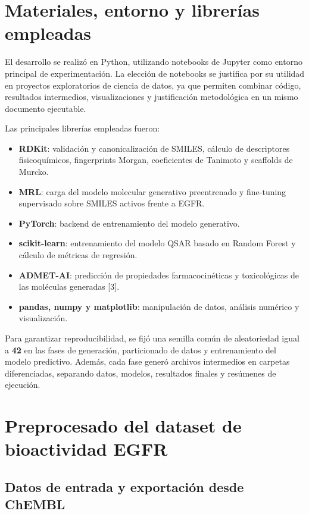 \documentclass[IB]{TFUOC}%
\begin{document}
\section{Materiales, entorno y librerías empleadas}

El desarrollo se realizó en Python, utilizando notebooks de Jupyter como entorno principal de experimentación. La elección de notebooks se justifica por su utilidad en proyectos exploratorios de ciencia de datos, ya que permiten combinar código, resultados intermedios, visualizaciones y justificación metodológica en un mismo documento ejecutable.

Las principales librerías empleadas fueron:

\begin{itemize}
    \item \textbf{RDKit}: validación y canonicalización de SMILES, cálculo de descriptores fisicoquímicos, fingerprints Morgan, coeficientes de Tanimoto y scaffolds de Murcko.
    \item \textbf{MRL}: carga del modelo molecular generativo preentrenado y fine-tuning supervisado sobre SMILES activos frente a EGFR.
    \item \textbf{PyTorch}: backend de entrenamiento del modelo generativo.
    \item \textbf{scikit-learn}: entrenamiento del modelo QSAR basado en Random Forest y cálculo de métricas de regresión.
    \item \textbf{ADMET-AI}: predicción de propiedades farmacocinéticas y toxicológicas de las moléculas generadas [3].
    \item \textbf{pandas, numpy y matplotlib}: manipulación de datos, análisis numérico y visualización.
\end{itemize}

Para garantizar reproducibilidad, se fijó una semilla común de aleatoriedad igual a \textbf{42} en las fases de generación, particionado de datos y entrenamiento del modelo predictivo. Además, cada fase generó archivos intermedios en carpetas diferenciadas, separando datos, modelos, resultados finales y resúmenes de ejecución.

\section{Preprocesado del dataset de bioactividad EGFR}

\subsection{Datos de entrada y exportación desde ChEMBL}
\end{document}
